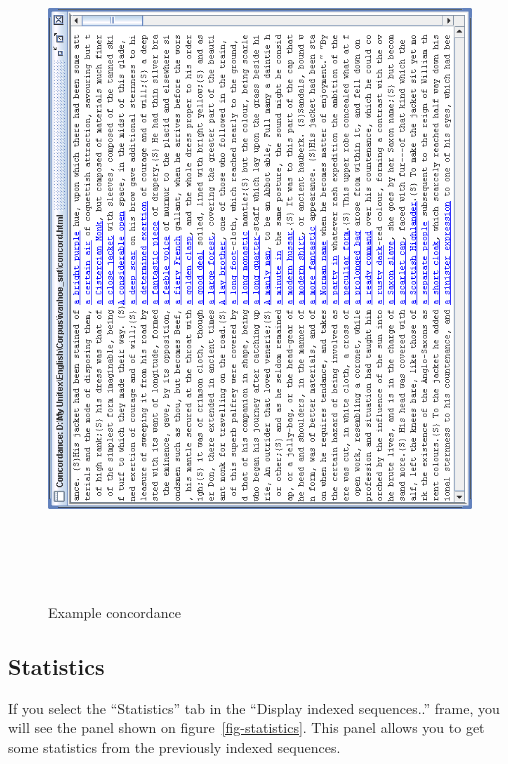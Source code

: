 \bigskip
\begin{figure}[!p]
\begin{center}
\includegraphics[height=18cm]{resources/img/fig4-8.png}
\caption{Example concordance\label{fig-example-concordance}}
\end{center}
\end{figure}

\clearpage
\subsection{Statistics}
\label{section-statistics}
If you select the ``Statistics'' tab in the ``Display indexed sequences..''
frame, you will see the panel shown on figure~\ref{fig-statistics}. This panel
allows you to get some statistics from the previously indexed sequences. 

